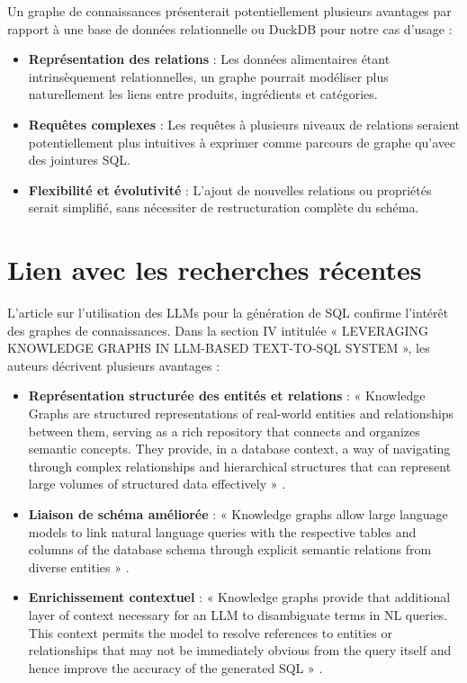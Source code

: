 \documentclass[a4paper,11pt]{article}
\begin{document}
Un graphe de connaissances présenterait potentiellement plusieurs avantages par rapport à une base de données relationnelle ou DuckDB pour notre cas d'usage :

\begin{itemize}
    \item \textbf{Représentation des relations} : Les données alimentaires étant intrinsèquement relationnelles, un graphe pourrait modéliser plus naturellement les liens entre produits, ingrédients et catégories.
    
    \item \textbf{Requêtes complexes} : Les requêtes à plusieurs niveaux de relations seraient potentiellement plus intuitives à exprimer comme parcours de graphe qu'avec des jointures SQL.
    
    \item \textbf{Flexibilité et évolutivité} : L'ajout de nouvelles relations ou propriétés serait simplifié, sans nécessiter de restructuration complète du schéma.
\end{itemize}



\newpage

\section{Lien avec les recherches récentes}
\label{sec:recherches}

L'article \citet{mohammadjafari2024natural} sur l'utilisation des LLMs pour la génération de SQL confirme l'intérêt des graphes de connaissances. Dans la section IV intitulée « LEVERAGING KNOWLEDGE GRAPHS IN LLM-BASED TEXT-TO-SQL SYSTEM », les auteurs décrivent plusieurs avantages :

\begin{itemize}
    \item \textbf{Représentation structurée des entités et relations} : « Knowledge Graphs are structured representations of real-world entities and relationships between them, serving as a rich repository that connects and organizes semantic concepts. They provide, in a database context, a way of navigating through complex relationships and hierarchical structures that can represent large volumes of structured data effectively » \citep{mohammadjafari2024natural}.
    
    \item \textbf{Liaison de schéma améliorée} : « Knowledge graphs allow large language models to link natural language queries with the respective tables and columns of the database schema through explicit semantic relations from diverse entities » \citep{mohammadjafari2024natural}.
    
    \item \textbf{Enrichissement contextuel} : « Knowledge graphs provide that additional layer of context necessary for an LLM to disambiguate terms in NL queries. This context permits the model to resolve references to entities or relationships that may not be immediately obvious from the query itself and hence improve the accuracy of the generated SQL » \citep{mohammadjafari2024natural}.
\end{itemize}
\end{document}
